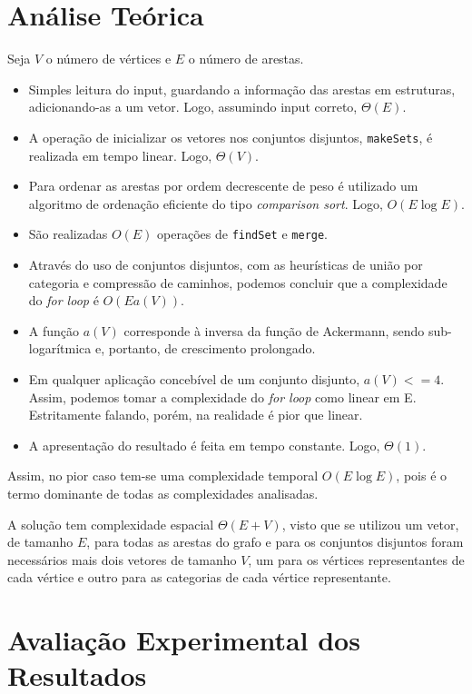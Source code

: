 \documentclass[12pt,a4paper]{article}
\begin{document}
  \section{Análise Teórica}

  Seja $V$ o número de vértices e $E$ o número de arestas.

  \begin{itemize}
    \setlength{\itemsep}{0pt}
    \item Simples leitura do input, guardando a informação das arestas em estruturas, adicionando-as a um vetor. Logo, assumindo input correto, $\Theta(E)$.
    \item A operação de inicializar os vetores nos conjuntos disjuntos, \texttt{makeSets}, é realizada em tempo linear. Logo, $\Theta(V)$.
    \item Para ordenar as arestas por ordem decrescente de peso é utilizado um algoritmo de ordenação eficiente do tipo \textit{comparison sort}. Logo, $O(E\log E)$.
    \item São realizadas $O(E)$ operações de \texttt{findSet} e \texttt{merge}.
    \item Através do uso de conjuntos disjuntos, com as heurísticas de união por categoria e compressão de caminhos, podemos concluir que a complexidade do \textit{for loop} é $O(E a(V))$.
    \item A função $a(V)$ corresponde à inversa da função de Ackermann\cite{enwiki:1123526697}, sendo sub-logarítmica e, portanto, de crescimento prolongado.
    \item Em qualquer aplicação concebível de um conjunto disjunto, $a(V) <= 4$. Assim, podemos tomar a complexidade do \textit{for loop} como linear em E. Estritamente falando, porém, na realidade é pior que linear.
    \item A apresentação do resultado é feita em tempo constante. Logo, $\Theta(1)$.
  \end{itemize}

  Assim, no pior caso tem-se uma complexidade temporal $O(E\log E)$, pois é o termo dominante de todas as complexidades analisadas.

  A solução tem complexidade espacial $\Theta(E + V)$, visto que se utilizou um vetor, de tamanho $E$, para todas as arestas do grafo e para os conjuntos disjuntos foram necessários mais dois vetores de tamanho $V$, um para os vértices representantes de cada vértice e outro para as categorias de cada vértice representante.

  \section{Avaliação Experimental dos Resultados}
\end{document}
